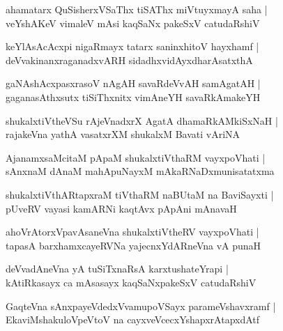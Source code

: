 \documentclass[twoside,12pt,openright]{book}
\newcounter{shloka}[chapter]
\begin{document}
\begin{shloka}
ahamatarx QuSisherxVSaThx tiSAThx miVtuyxmayA saha |\\
veYshAKeV vimaleV mAsi kaqSaNx pakeSxV catudaRshiV 
\end{shloka}

\begin{shloka}
keYlAsAcAcxpi nigaRmayx tatarx saninxhitoV hayxhamf |\\
deVvakinanxraganadxvARH sidadhxvidAyxdharAsatxthA
\end{shloka}

\begin{shloka}
gaNAshAcxpasxrasoV nAgAH savaRdeVvAH samAgatAH |\\
gaganasAthxsutx tiSiThxnitx vimAneYH savaRkAmakeYH 
\end{shloka}

\begin{shloka}
shukalxtiVtheVSu rAjeVnadxrX AgatA dhamaRkAMkiSxNaH |\\
rajakeVna yathA vasatxrXM shukalxM Bavati vAriNA
\end{shloka}

\begin{shloka}
AjanamxsaMcitaM pApaM shukalxtiVthaRM vayxpoVhati |\\
sAnxnaM dAnaM mahApuNayxM mAkaRNaDxmunisatatxma
\end{shloka}

\begin{shloka}
shukalxtiVthARtapxraM tiVthaRM naBUtaM na BaviSayxti |\\
pUveRV vayasi kamARNi kaqtAvx pApAni mAnavaH 
\end{shloka}

\begin{shloka}
ahoVrAtorxVpavAsaneVna shukalxtiVtheRV vayxpoVhati |\\
tapasA  barxhamxcayeRVNa yajecnxYdARneVna vA punaH 
\end{shloka}

\begin{shloka}
deVvadAneVna yA tuSiTxnaRsA karxtushateYrapi  |\\
kAtiRkasayx ca mAsasayx kaqSaNxpakeSxV catudaRshiV 
\end{shloka}

\begin{shloka}
GaqteVna sAnxpayeVdedxVvamupoVSayx parameVshavxramf |\\
EkaviMshakuloVpeVtoV na cayxveVcecxYshapxrAtapxdAtf 
\end{shloka}
\end{document}
